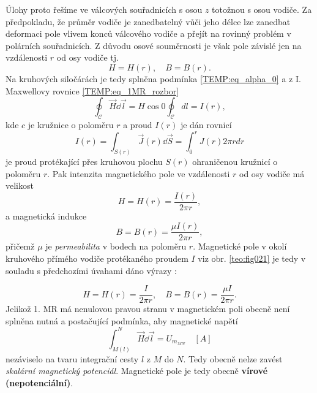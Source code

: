       
    Úlohy proto řešíme ve válcových souřadnicích s osou $z$ totožnou s osou vodiče. Za 
    předpokladu, že průměr vodiče je zanedbatelný vůči jeho délce lze zanedbat deformaci pole 
    vlivem konců válcového vodiče a přejít na rovinný problém v polárních souřadnicích. Z důvodu 
    osové  souměrnosti je však pole závislé jen na vzdálenosti $r$ od osy vodiče tj. $$H = H(r), 
    \quad B = B(r).$$ Na kruhových siločárách je tedy splněna podmínka \ref{TEMP:eq_alpha_0} a z 
    I. Maxwellovy rovnice \ref{TEMP:eq_1MR_rozbor} 
    \begin{equation}\label{TEMP:eq_1MR_rozbor2}
      \oint_{\mathcal{C}}\vec{H}\dd{\vec{l}} = H\cos0\oint_{\mathcal{C}}dl = I(r),
    \end{equation}     
    kde $c$ je kružnice o poloměru $r$ a proud $I(r)$ je dán rovnicí
    \begin{equation}\label{TEMP:eq_1MR_Ir}
      I(r) = \int_{S(r)}\vec{J}(r)\dd{\vec{S}} = \int_0^rJ(r)2\pi rdr
    \end{equation}           
    je proud protékající přes kruhovou plochu $S(r)$ ohraničenou kružnicí o poloměru $r$. Pak
    intenzita magnetického pole ve vzdálenosti $r$ od osy vodiče má velikost
    \begin{equation}\label{TEMP:eq_Hr_vodice}
      H = H(r) = \frac{I(r)}{2\pi r},
    \end{equation}       
    a magnetická indukce 
    \begin{equation}\label{TEMP:eq_Br_vodice}
      B = B(r) = \frac{\mu I(r)}{2\pi r},
    \end{equation}       
    přičemž $\mu$ je \emph{permeabilita} v bodech na poloměru $r$. Magnetické pole v okolí
    kruhové\-ho přímého vodiče protékaného proudem $I$ viz obr. \ref{teo:fig021} je tedy v souladu 
    s předchozími úvahami dáno výrazy \cite[s.~183 - 185]{Kotlan1999}:

     
    \begin{equation}\label{TEMP:eq_Hr_Br_vodice}
      H = H(r) = \frac{I}{2\pi r}, \quad B = B(r) = \frac{\mu I}{2\pi r}.
    \end{equation}   
    Jelikož 1. MR má nenulovou pravou stranu v magnetickém poli obecně není splněna nutná a
    postačující podmínka, aby magnetické napětí
    \begin{equation}\label{TEMP:eq_mag_napeti}
      \int_{M(l)}^N\vec{H}\dd{\vec{l}} = U_{m_{MN}} \quad [A]
    \end{equation}       
    nezáviselo na tvaru integrační cesty $l$ z $M$ do $N$. Tedy obecně nelze zavést \emph{skalární
    magnetický potenciál}. Magnetické pole je tedy obecně \textbf{vírové (nepotenciální)}.

